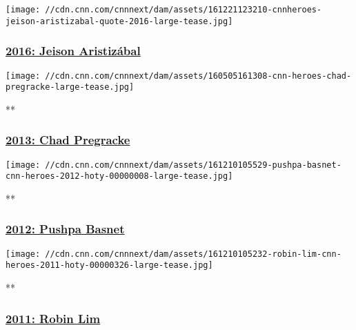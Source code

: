 \href{/2017/12/15/opinions/jeison-aristizabal-2016-hero-year-update-letter/index.html}{}

\texttt{[image: //cdn.cnn.com/cnnnext/dam/assets/161221123210-cnnheroes-jeison-aristizabal-quote-2016-large-tease.jpg]}

\hypertarget{2016-jeison-aristizuxe1bal}{%
\subsubsection{\texorpdfstring{\href{/2017/12/15/opinions/jeison-aristizabal-2016-hero-year-update-letter/index.html}{2016:
Jeison
Aristizábal}}{2016: Jeison Aristizábal}}\label{2016-jeison-aristizuxe1bal}}

\href{/videos/us/2017/03/27/cnnheroes-update-2013-hero-of-the-year-chad-pregracke.cnn}{}

\texttt{[image: //cdn.cnn.com/cnnnext/dam/assets/160505161308-cnn-heroes-chad-pregracke-large-tease.jpg]}

**

\hypertarget{2013-chad-pregracke}{%
\subsubsection{\texorpdfstring{\href{/videos/us/2017/03/27/cnnheroes-update-2013-hero-of-the-year-chad-pregracke.cnn}{2013:
Chad Pregracke}}{2013: Chad Pregracke}}\label{2013-chad-pregracke}}

\href{/videos/world/2017/03/27/cnnheroes-update-2012-hero-of-the-year-pushpa-basnet.cnn}{}

\texttt{[image: //cdn.cnn.com/cnnnext/dam/assets/161210105529-pushpa-basnet-cnn-heroes-2012-hoty-00000008-large-tease.jpg]}

**

\hypertarget{2012-pushpa-basnet}{%
\subsubsection{\texorpdfstring{\href{/videos/world/2017/03/27/cnnheroes-update-2012-hero-of-the-year-pushpa-basnet.cnn}{2012:
Pushpa Basnet}}{2012: Pushpa Basnet}}\label{2012-pushpa-basnet}}

\href{/videos/world/2017/03/24/cnnheroes-update-2011-hero-of-the-year-robin-lim.cnn}{}

\texttt{[image: //cdn.cnn.com/cnnnext/dam/assets/161210105232-robin-lim-cnn-heroes-2011-hoty-00000326-large-tease.jpg]}

**

\hypertarget{2011-robin-lim}{%
\subsubsection{\texorpdfstring{\href{/videos/world/2017/03/24/cnnheroes-update-2011-hero-of-the-year-robin-lim.cnn}{2011:
Robin Lim}}{2011: Robin Lim}}\label{2011-robin-lim}}

